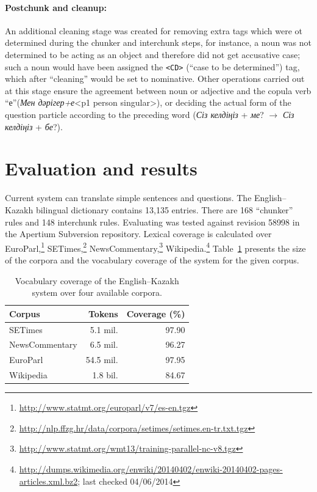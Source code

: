\documentclass[11pt]{article}
\begin{document}
\paragraph{Postchunk and cleanup:}
An additional cleaning stage was created for removing extra tags which were ot determined during the chunker and 
interchunk steps, for instance, a noun was not determined to be acting as an object and therefore did not get accusative case; such a noun would have been assigned the  \texttt{<CD>} (``case to be determined'') tag, which after ``cleaning'' would be set to nominative. Other operations  carried out at this stage ensure
the agreement between noun or adjective and the copula verb ``е''(\emph{Мен дәрігер+е}<p1 person singular>),  or deciding the actual form of the question particle according to the preceding word (\emph{Сіз келдіңіз} + \emph{ме}? \(\to\) \emph{Сіз келдіңіз} + \emph{бе}?).

\section{Evaluation and results}

Current system can translate simple sentences and questions. The English--Kazakh bilingual dictionary 
contains 13,135 entries. There are 168 ``chunker'' rules and 148 interchunk rules. 
Evaluating was tested against revision 58998 in the Apertium Subversion repository. Lexical coverage is calculated 
over EuroParl,\footnote{\url{http://www.statmt.org/europarl/v7/es-en.tgz}} SETimes,\footnote{\url{http://nlp.ffzg.hr/data/corpora/setimes/setimes.en-tr.txt.tgz}} NewsCommentary,\footnote{\url{http://www.statmt.org/wmt13/training-parallel-nc-v8.tgz}} Wikipedia.\footnote{\url{http://dumps.wikimedia.org/enwiki/20140402/enwiki-20140402-pages-articles.xml.bz2}; last checked 04/06/2014} 
Table~\ref{table:coverage} presents the size of the corpora and the vocabulary coverage of the system for the given corpus.

\begin{table}
  \centering
  \begin{tabular}{|l|r|r|}
    \hline
    \textbf{Corpus} & \textbf{Tokens} & \textbf{Coverage} (\%) \\
    \hline
    SETimes & 5.1 mil. & 97.90 \\
    NewsCommentary & 6.5 mil. & 96.27 \\
    EuroParl & 54.5 mil. & 97.95 \\
    Wikipedia & 1.8 bil. & 84.67 \\
    \hline
  \end{tabular}
  \caption{Vocabulary coverage of the English--Kazakh system over four available corpora.}
  \label{table:coverage}
\end{table}
\end{document}
